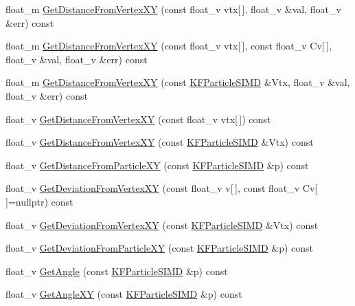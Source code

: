 \begin{DoxyCompactItemize}
\item 
float\+\_\+m \hyperlink{classKFParticleSIMD_a874d6387e88fce6fe69d7a6a811a377f}{Get\+Distance\+From\+Vertex\+XY} (const float\+\_\+v vtx\mbox{[}$\,$\mbox{]}, float\+\_\+v \&val, float\+\_\+v \&err) const 
\item 
float\+\_\+m \hyperlink{classKFParticleSIMD_a2ebfe06b454da6d2b7c5d0bfef26e9ca}{Get\+Distance\+From\+Vertex\+XY} (const float\+\_\+v vtx\mbox{[}$\,$\mbox{]}, const float\+\_\+v Cv\mbox{[}$\,$\mbox{]}, float\+\_\+v \&val, float\+\_\+v \&err) const 
\item 
float\+\_\+m \hyperlink{classKFParticleSIMD_a20395d1d794abd0e0922c7dca48950db}{Get\+Distance\+From\+Vertex\+XY} (const \hyperlink{classKFParticleSIMD}{K\+F\+Particle\+S\+I\+MD} \&Vtx, float\+\_\+v \&val, float\+\_\+v \&err) const 
\item 
float\+\_\+v \hyperlink{classKFParticleSIMD_a9d5224c105404e7cd293d29823de1094}{Get\+Distance\+From\+Vertex\+XY} (const float\+\_\+v vtx\mbox{[}$\,$\mbox{]}) const 
\item 
float\+\_\+v \hyperlink{classKFParticleSIMD_a1fa77112f03433e799068e573c2a07d6}{Get\+Distance\+From\+Vertex\+XY} (const \hyperlink{classKFParticleSIMD}{K\+F\+Particle\+S\+I\+MD} \&Vtx) const 
\item 
float\+\_\+v \hyperlink{classKFParticleSIMD_aa8fb673d2b680ca33297a1e401aa7208}{Get\+Distance\+From\+Particle\+XY} (const \hyperlink{classKFParticleSIMD}{K\+F\+Particle\+S\+I\+MD} \&p) const 
\item 
float\+\_\+v \hyperlink{classKFParticleSIMD_aa636c8a09e8e53b2393eb7e4e02a7127}{Get\+Deviation\+From\+Vertex\+XY} (const float\+\_\+v v\mbox{[}$\,$\mbox{]}, const float\+\_\+v Cv\mbox{[}$\,$\mbox{]}=nullptr) const 
\item 
float\+\_\+v \hyperlink{classKFParticleSIMD_a1b524c1e7e92bcb25417e072198676da}{Get\+Deviation\+From\+Vertex\+XY} (const \hyperlink{classKFParticleSIMD}{K\+F\+Particle\+S\+I\+MD} \&Vtx) const 
\item 
float\+\_\+v \hyperlink{classKFParticleSIMD_aeef9436d096312a52ff8d9a2e691f115}{Get\+Deviation\+From\+Particle\+XY} (const \hyperlink{classKFParticleSIMD}{K\+F\+Particle\+S\+I\+MD} \&p) const 
\item 
float\+\_\+v \hyperlink{classKFParticleSIMD_a742d47505d1051ecf081040ac15c9798}{Get\+Angle} (const \hyperlink{classKFParticleSIMD}{K\+F\+Particle\+S\+I\+MD} \&p) const 
\item 
float\+\_\+v \hyperlink{classKFParticleSIMD_a485a5cc06021dbc62322c2cb7a706251}{Get\+Angle\+XY} (const \hyperlink{classKFParticleSIMD}{K\+F\+Particle\+S\+I\+MD} \&p) const 

\end{DoxyCompactItemize}
